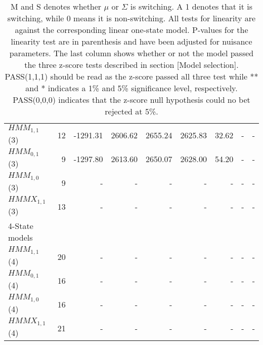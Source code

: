 \documentclass[11pt,a4paper,oneside]{article}
\begin{document}
\begin{table}[h!]
\begin{tabular}{lrrrrrrrr}
\hspace{3mm}$HMM_{1,1}$(3) & 12 & -1291.31 & 2606.62 & 2655.24 & 2625.83 & 32.62 & - & -  \\

\hspace{3mm}$HMM_{0,1}$(3) & 9 & -1297.80 & 2613.60 & 2650.07 & 2628.00 & 54.20 & - & -  \\

\hspace{3mm}$HMM_{1,0}$(3) & 9 & - & - & - & - & - & - & -  \\

\hspace{3mm}$HMMX_{1,1}$(3)& 13 & - & - & - & - & - & - & -  \\

4-State models & & & & & & &  \\ 

\hspace{3mm}$HMM_{1,1}$(4) & 20 & - & - & - & - & - & - & - \\

\hspace{3mm}$HMM_{0,1}$(4) & 16 & - & - & - & - & - & - & - \\

\hspace{3mm}$HMM_{1,0}$(4) & 16 & - & - & - & - & - & - & - \\

\hspace{3mm}$HMMX_{1,1}$(4)& 21 & - & - & - & - & - & - & -  \\





\bottomrule
\end{tabular}
\caption*{M and S denotes whether $\mu$ or $\Sigma$ is switching. A 1 denotes that it is switching, while 0 means it is non-switching. All tests for linearity are against the corresponding linear one-state model. P-values for the linearity test are in parenthesis and have been adjusted for nuisance parameters. The last column shows whether or not the model passed the three z-score tests described in section [Model selection]. PASS(1,1,1) should be read as the z-score passed all three test while ** and * indicates a 1\% and 5\% significance level, respectively. PASS(0,0,0) indicates that the z-score null hypothesis could no bet rejected at 5\%.}
\vspace{-20mm}
\end{table}
\end{document}

